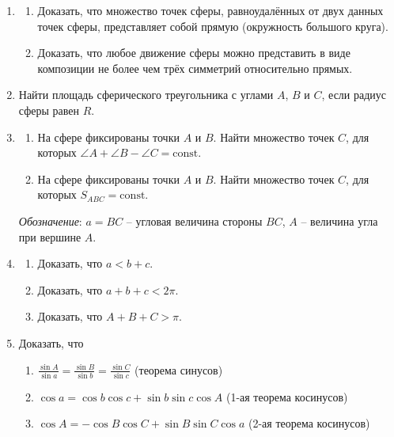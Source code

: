 	\begin{enumerate}
		\item
		\begin{enumerate}
			\item Доказать, что множество точек сферы, равноудалённых от двух данных точек сферы, представляет собой прямую (окружность большого круга).
 
			\item Доказать, что любое движение сферы можно представить в виде композиции не более чем трёх симметрий относительно прямых.
		\end{enumerate}
 
		\item Найти площадь сферического треугольника с углами $A$, $B$ и $C$, если радиус сферы равен $R$.
 
		\item
		\begin{enumerate}
			\item На сфере фиксированы точки $A$ и $B$. Найти множество точек $C$, для которых $\angle A + \angle B - \angle C = \mathrm{const}$.
 
			\item На сфере фиксированы точки $A$ и $B$. Найти множество точек $C$, для которых $S_{ABC} = \mathrm{const}$.
		\end{enumerate}
 
		\textit{Обозначение}: $a = BC$ -- угловая величина стороны $BC$, $A$ -- величина угла при вершине $A$.
 
		\item
		\begin{enumerate}
			\item Доказать, что $a < b + c$.
			\item Доказать, что $a + b + c < 2\pi$.
			\item Доказать, что $A + B + C > \pi$.
		\end{enumerate}
 
		\item Доказать, что
		\begin{enumerate}
			\item $\frac{\sin A}{\sin a} = \frac{\sin B}{\sin b} = \frac{\sin C}{\sin c}$ (теорема синусов)
			\item $\cos a = \cos b \cos c + \sin b \sin c \cos A$ (1-ая теорема косинусов)
			\item $\cos A = -\cos B \cos C + \sin B \sin C \cos a$ (2-ая теорема косинусов)
		\end{enumerate}
 

\end{enumerate}
